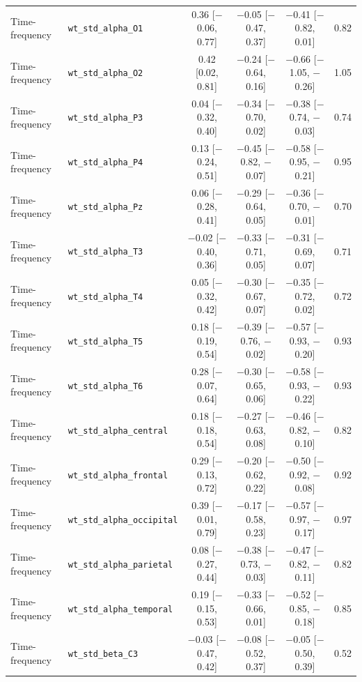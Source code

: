 {\begin{longtable}{llcccc}
Time-frequency & \texttt{wt\_std\_alpha\_O1} & 0.36 [$-$0.06, 0.77] & $-$0.05 [$-$0.47, 0.37] & $-$0.41 [$-$0.82, 0.01] & 0.82 \\
Time-frequency & \texttt{wt\_std\_alpha\_O2} & 0.42 [0.02, 0.81] & $-$0.24 [$-$0.64, 0.16] & $-$0.66 [$-$1.05, $-$0.26] & 1.05 \\
Time-frequency & \texttt{wt\_std\_alpha\_P3} & 0.04 [$-$0.32, 0.40] & $-$0.34 [$-$0.70, 0.02] & $-$0.38 [$-$0.74, $-$0.03] & 0.74 \\
Time-frequency & \texttt{wt\_std\_alpha\_P4} & 0.13 [$-$0.24, 0.51] & $-$0.45 [$-$0.82, $-$0.07] & $-$0.58 [$-$0.95, $-$0.21] & 0.95 \\
Time-frequency & \texttt{wt\_std\_alpha\_Pz} & 0.06 [$-$0.28, 0.41] & $-$0.29 [$-$0.64, 0.05] & $-$0.36 [$-$0.70, $-$0.01] & 0.70 \\
Time-frequency & \texttt{wt\_std\_alpha\_T3} & $-$0.02 [$-$0.40, 0.36] & $-$0.33 [$-$0.71, 0.05] & $-$0.31 [$-$0.69, 0.07] & 0.71 \\
Time-frequency & \texttt{wt\_std\_alpha\_T4} & 0.05 [$-$0.32, 0.42] & $-$0.30 [$-$0.67, 0.07] & $-$0.35 [$-$0.72, 0.02] & 0.72 \\
Time-frequency & \texttt{wt\_std\_alpha\_T5} & 0.18 [$-$0.19, 0.54] & $-$0.39 [$-$0.76, $-$0.02] & $-$0.57 [$-$0.93, $-$0.20] & 0.93 \\
Time-frequency & \texttt{wt\_std\_alpha\_T6} & 0.28 [$-$0.07, 0.64] & $-$0.30 [$-$0.65, 0.06] & $-$0.58 [$-$0.93, $-$0.22] & 0.93 \\
Time-frequency & \texttt{wt\_std\_alpha\_central} & 0.18 [$-$0.18, 0.54] & $-$0.27 [$-$0.63, 0.08] & $-$0.46 [$-$0.82, $-$0.10] & 0.82 \\
Time-frequency & \texttt{wt\_std\_alpha\_frontal} & 0.29 [$-$0.13, 0.72] & $-$0.20 [$-$0.62, 0.22] & $-$0.50 [$-$0.92, $-$0.08] & 0.92 \\
Time-frequency & \texttt{wt\_std\_alpha\_occipital} & 0.39 [$-$0.01, 0.79] & $-$0.17 [$-$0.58, 0.23] & $-$0.57 [$-$0.97, $-$0.17] & 0.97 \\
Time-frequency & \texttt{wt\_std\_alpha\_parietal} & 0.08 [$-$0.27, 0.44] & $-$0.38 [$-$0.73, $-$0.03] & $-$0.47 [$-$0.82, $-$0.11] & 0.82 \\
Time-frequency & \texttt{wt\_std\_alpha\_temporal} & 0.19 [$-$0.15, 0.53] & $-$0.33 [$-$0.66, 0.01] & $-$0.52 [$-$0.85, $-$0.18] & 0.85 \\
Time-frequency & \texttt{wt\_std\_beta\_C3} & $-$0.03 [$-$0.47, 0.42] & $-$0.08 [$-$0.52, 0.37] & $-$0.05 [$-$0.50, 0.39] & 0.52 \\

\end{longtable}}
